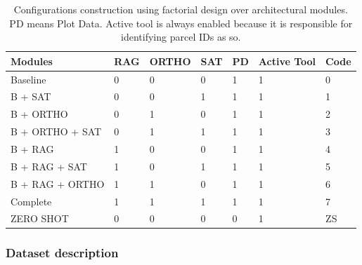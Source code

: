 \documentclass[preprint,review,12pt,authoryear]{elsarticle}
\newcommand{\tabfont}{\scriptsize}
\begin{document}
\begin{table}[t!]
	\caption{Configurations construction using factorial design over architectural modules. PD means Plot Data. Active tool is always enabled because it is responsible for identifying parcel IDs as so.}
	\label{tab:ablation_configs}
	\tabfont
	\setlength{\tabcolsep}{3pt}
	\begin{tabular}{p{}
			p{}
			p{}
			p{}
			p{}
			p{}
			p{}
		}
		\hline
		\textbf{Modules} & \textbf{RAG} & \textbf{ORTHO} & \textbf{SAT} & \textbf{PD} & \textbf{Active Tool} & \textbf{Code} \\
		\hline
		Baseline         & 0            & 0              & 0            & 1           & 1                    & 0             \\
		B + SAT          & 0            & 0              & 1            & 1           & 1                    & 1             \\
		B + ORTHO        & 0            & 1              & 0            & 1           & 1                    & 2             \\
		B + ORTHO + SAT  & 0            & 1              & 1            & 1           & 1                    & 3             \\
		B + RAG          & 1            & 0              & 0            & 1           & 1                    & 4             \\
		B + RAG + SAT    & 1            & 0              & 1            & 1           & 1                    & 5             \\
		B + RAG + ORTHO  & 1            & 1              & 0            & 1           & 1                    & 6             \\
		Complete         & 1            & 1              & 1            & 1           & 1                    & 7             \\
		ZERO SHOT        & 0            & 0              & 0            & 0           & 1                    & ZS            \\
		\hline
	\end{tabular}
\end{table}


\subsubsection{Dataset description}
\end{document}
